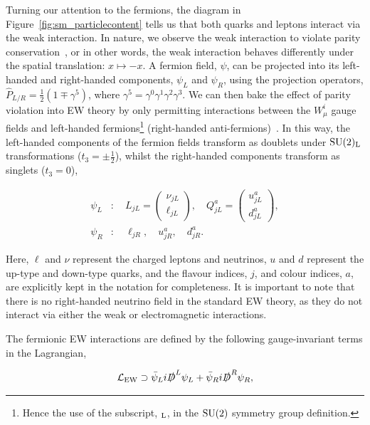 Turning our attention to the fermions, the diagram in Figure~\ref{fig:sm_particlecontent} tells us that both quarks and leptons interact via the weak interaction. In nature, we observe the weak interaction to violate parity conservation~\cite{PhysRev.105.1413}, or in other words, the weak interaction behaves differently under the spatial translation: $x\mapsto-x$. A fermion field, $\psi$, can be projected into its left-handed and right-handed components, $\psi_L$ and $\psi_R$, using the projection operators, $\hat{P}_{L/R} = \frac{1}{2}(1\mp\gamma^5)$, where $\gamma^5=\gamma^0\gamma^1\gamma^2\gamma^3$. We can then bake the effect of parity violation into EW theory by only permitting interactions between the $W^i_\mu$ gauge fields and left-handed fermions\footnote{Hence the use of the subscript, ${}_{\rm{L}}$, in the ${\rm{SU}}(2)$ symmetry group definition.} (right-handed anti-fermions)~\cite{Aitchison:2004cs}. In this way, the left-handed components of the fermion fields transform as doublets under ${\rm{SU}}(2)_{\rm{L}}$ transformations ($t_3=\pm\frac{1}{2}$), whilst the right-handed components transform as singlets ($t_3=0$),

\begin{equation}
\begin{split}
    \psi_L&: \quad L_{jL} = \begin{pmatrix}
    \nu_{jL} \\
    \ell_{jL}
    \end{pmatrix}, \quad Q^a_{jL} = \begin{pmatrix}
    u^a_{jL} \\
    d^a_{jL}
    \end{pmatrix},
    \\
    \psi_R&: \quad \ell_{jR}, \quad u^a_{jR}, \quad d^a_{jR}.
\end{split}
\end{equation}

\noindent
Here, $\ell$ and $\nu$ represent the charged leptons and neutrinos, $u$ and $d$ represent the up-type and down-type quarks, and the flavour indices, $j$, and colour indices, $a$, are explicitly kept in the notation for completeness. It is important to note that there is no right-handed neutrino field in the standard EW theory, as they do not interact via either the weak or electromagnetic interactions.

The fermionic EW interactions are defined by the following gauge-invariant terms in the Lagrangian,

\begin{equation}\label{eq:ew_interactionterms}
    \mathcal{L}_{\rm{EW}} \supset \bar{\psi}_L i \slashed{D}^L \psi_L + \bar{\psi}_R i \slashed{D}^R \psi_R,
\end{equation}

